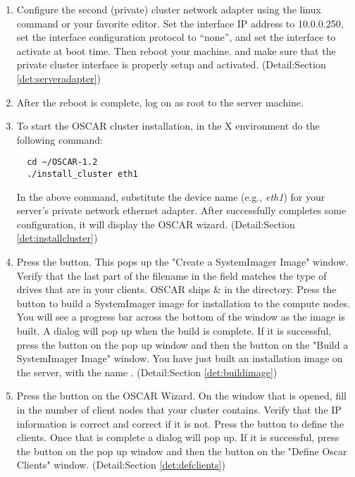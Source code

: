 \begin {enumerate}
\item Configure the second (private) cluster network adapter using the linux
 command or your favorite editor. Set the interface 
IP address to 10.0.0.250, set the interface configuration protocol
to ``none'', and set the interface to activate at boot time.
Then reboot your machine. and make sure that the private cluster
interface is properly setup and activated. 
(Detail:Section \ref{det:serveradapter})

\item After the reboot is complete, log on as root to the server 
machine.

\item To start the OSCAR cluster installation,  in the X environment do
the following command:

\begin{verbatim}
  cd ~/OSCAR-1.2
  ./install_cluster eth1
\end{verbatim}
  
In the above command, substitute the device name 
(e.g., \emph{eth1})
for your server's private network ethernet adapter. After 
successfully completes some configuration, it will display 
the OSCAR wizard.
(Detail:Section \ref{det:installcluster})

\item Press the  button. 
This pops up the "Create a SystemImager Image" window. Verify that the last
part of the filename in the  field matches
the type of drives that are in your clients. OSCAR ships 
\&  in the  directory.
Press the  button to build a SystemImager image for installation to
the compute nodes.  You will see a progress bar across the bottom
of the window as the image is built.  A dialog will pop up when the build is complete. 
If it is successful, press the  button on the pop up window 
and then the  button on the "Build a SystemImager
Image" window. You have just built an installation image on the
server, with the name .
(Detail:Section \ref{det:buildimage})

\item Press the  button on the OSCAR Wizard. 
On the window that is opened, fill in the number of client nodes that your cluster
contains. Verify that the IP information is correct and correct if it is not.
Press the  button to define the clients. Once that is 
complete a dialog will pop up. 
If it is successful, press the  button on the pop up window 
and then the  button on the "Define Oscar Clients"
window. 
(Detail:Section \ref{det:defclients})


\end{enumerate}
